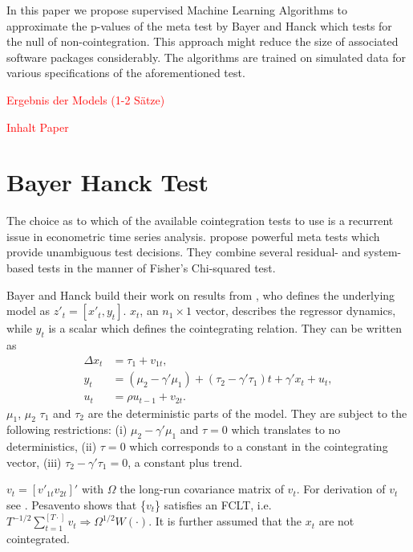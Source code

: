 \documentclass[12pt,a4paper]{article}
\begin{document}
In this paper we propose supervised Machine Learning Algorithms to
approximate the p-values of the meta test by Bayer and Hanck
\autocite*{Bayerhanck_2012} which tests for the null of
non-cointegration. This approach might reduce the size of associated
software packages considerably. The algorithms are trained on simulated
data for various specifications of the aforementioned test.

\textcolor{red}{Ergebnis der Models (1-2 Sätze)}

\textcolor{red}{Inhalt Paper}

\hypertarget{bayer-hanck-test}{%
\section{Bayer Hanck Test}\label{bayer-hanck-test}}

The choice as to which of the available cointegration tests to use is a
recurrent issue in econometric time series analysis.
\textcite{Bayerhanck_2012} propose powerful meta tests which provide
unambiguous test decisions. They combine several residual- and
system-based tests in the manner of Fisher's \autocite*{Fisher_1932}
Chi-squared test.

Bayer and Hanck build their work on results from
\textcite{Pesavento_2004}, who defines the underlying model as
\(z'_t = [x'_t, y_t]\). \(x_t\), an \(n_1 \times 1\) vector, describes
the regressor dynamics, while \(y_t\) is a scalar which defines the
cointegrating relation. They can be written as \begin{align}
\Delta x_t &= \tau_1 + v_{1t}, \\
y_t &= (\mu_2 - \gamma' \mu_1) + (\tau_2 - \gamma' \tau_1) t + \gamma' x_t + u_t, \\
u_t &= \rho u_{t-1} + v_{2t}.
\end{align} \(\mu_1\), \(\mu_2\) \(\tau_1\) and \(\tau_2\) are the
deterministic parts of the model. They are subject to the following
restrictions: (i) \(\mu_2 - \gamma' \mu_1\) and \(\tau = 0\) which
translates to no deterministics, (ii) \(\tau = 0\) which corresponds to
a constant in the cointegrating vector, (iii)
\(\tau_2 - \gamma' \tau_1 = 0\), a constant plus trend.

\(v_t = [v'_{1t} v_{2t}]'\) with \(\Omega\) the long-run covariance
matrix of \(v_t\). For derivation of \(v_t\) see
\textcite{Pesavento_2004}. Pesavento shows that \{\(v_t\)\} satisfies an
FCLT,
i.e.~\(T^{-1/2} \sum^{[T \cdot]}_{t=1} v_t \Rightarrow \Omega^{1/2} W(\cdot)\).
It is further assumed that the \(x_t\) are not cointegrated.
\end{document}
